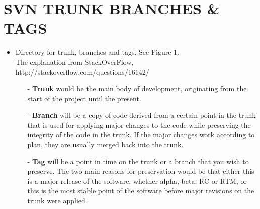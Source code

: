 \section{SVN TRUNK BRANCHES \& TAGS}
\begin{itemize}
\item
	Directory for trunk, branches and tags. See Figure 1. \\
	The explanation from StackOverFlow, http://stackoverflow.com/questions/16142/
	\begin{itemize}
	\item[-]
    \textbf{Trunk} would be the main body of development, originating from the start of the project until the present.
	\item[-]
    \textbf{Branch} will be a copy of code derived from a certain point in the trunk that is used for applying major changes to the code while preserving the integrity of the code in the trunk. If the major changes work according to plan, they are usually merged back into the trunk.
	\item[-]
    \textbf{Tag} will be a point in time on the trunk or a branch that you wish to preserve. The two main reasons for preservation would be that either this is a major release of the software, whether alpha, beta, RC or RTM, or this is the most stable point of the software before major revisions on the trunk were applied.
	\end{itemize}
	

\end{itemize}

